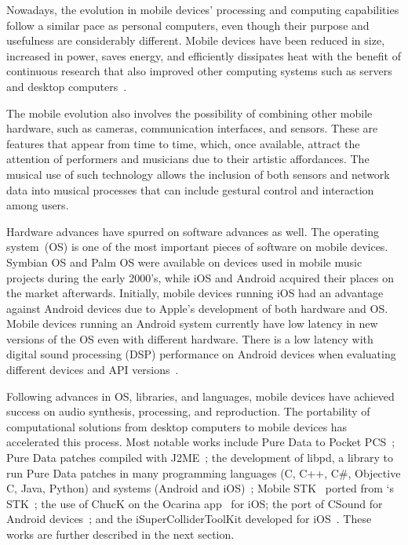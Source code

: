 Nowadays, the evolution in mobile devices' processing and computing capabilities follow a similar pace as personal computers, even though their purpose and usefulness are considerably different.
Mobile devices have been reduced in size, increased in power, saves energy, and efficiently dissipates heat with the benefit of continuous research that also improved other computing systems such as servers and desktop computers~\cite{Barroso2007energy}.

The mobile evolution also involves the possibility of combining other mobile hardware, such as cameras, communication interfaces, and sensors. 
These are features that appear from time to time, which, once available, attract the attention of performers and musicians due to their artistic affordances.
The musical use of such technology allows the inclusion of both sensors and network data into musical processes that can include gestural control and interaction among users.

Hardware advances have spurred on software advances as well.
The operating system~(OS) is one of the most important pieces of software on mobile devices.
Symbian OS and Palm OS were available on devices used in mobile music projects during the early 2000's, while iOS and Android acquired their places on the market afterwards.
Initially, mobile devices running iOS had an advantage against Android devices due to Apple's development of both hardware and OS.
Mobile devices running an Android system currently have low latency in new versions of the OS even with different hardware.
There is a low latency with digital sound processing (DSP) performance on Android devices when evaluating different devices and API versions~\citep{Bianchi2012ontheperformance}.

Following advances in OS, libraries, and languages, mobile devices have achieved success on audio synthesis, processing, and reproduction.
The portability of computational solutions from desktop computers to mobile devices has accelerated this process.
Most notable works include Pure Data to Pocket PCS~\citep{Geiger2003pda}; Pure Data patches compiled with J2ME~\citep{Schiemer2005pocketgamelan}; the development of libpd, a library to run Pure Data patches in many programming languages (C, C++, C\#, Objective C, Java, Python) and systems (Android and iOS)~\citep{Brinkmann2011embeddingpd}; Mobile STK~\citep{Essl2006mobilestk} ported from \citeauthor{Cook1999stk}`s STK~\citep{Cook1999stk}; the use of ChucK on the Ocarina app~\citep{Wang2008domobilephones} for iOS; the port of CSound for Android devices~\citep{Yi2012csound}; and the iSuperColliderToolKit developed for iOS~\citep{Ito2015isupercolliderkit}.
These works are further described in the next section.

